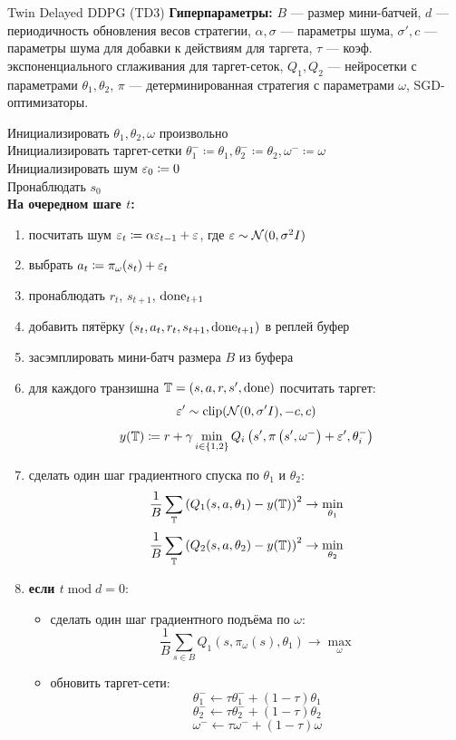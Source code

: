 \begin{algorithm}[label = TD3]{Twin Delayed DDPG (TD3)}
\textbf{Гиперпараметры:} $B$ --- размер мини-батчей, $d$ --- периодичность обновления весов стратегии, $\alpha, \sigma$ --- параметры шума, $\sigma', c$ --- параметры шума для добавки к действиям для таргета, $\tau$ --- коэф. экспоненциального сглаживания для таргет-сеток, $Q_1, Q_2$ --- нейросетки с параметрами $\theta_1, \theta_2$, $\pi$ --- детерминированная стратегия с параметрами $\omega$, SGD-оптимизаторы.

\vspace{0.3cm}
Инициализировать $\theta_1, \theta_2, \omega$ произвольно \\
Инициализировать таргет-сетки $\theta_1^- \coloneqq \theta_1, \theta_2^- \coloneqq \theta_2, \omega^- \coloneqq \omega$ \\
Инициализировать шум $\varepsilon_0 \coloneqq 0$ \\
Пронаблюдать $s_0$ \\
\textbf{На очередном шаге $t$:}
\begin{enumerate}
    \item посчитать шум $\varepsilon_{t} \coloneqq \alpha \varepsilon_{t-1} + \varepsilon$, где $\varepsilon \sim \mathcal{N}(0, \sigma^2 I)$
    \item выбрать $a_t \coloneqq \pi_\omega(s_t) + \varepsilon_{t}$
    \item пронаблюдать $r_t$,  $s_{t+1}$, $\mathrm{done}_{t+1}$
    \item добавить пятёрку $(s_t, a_t, r_t, s_{t+1}, \mathrm{done}_{t+1})$ в реплей буфер
    \item засэмплировать мини-батч размера $B$ из буфера
    \item для каждого транзишна $\mathbb{T} = (s, a, r, s', \mathrm{done})$ посчитать таргет:
    $$\varepsilon' \sim \mathrm{clip}(\mathcal{N}(0, \sigma'I), -c, c)$$
    $$y(\mathbb{T} ) \coloneqq r + \gamma \min_{i \in \{1, 2\}}Q_i\left( s', \pi \left( s', \omega^{-}\right) + \varepsilon', \theta_i^{-} \right)$$
    \item сделать один шаг градиентного спуска по $\theta_1$ и $\theta_2$:
    $$\frac{1}{B}\sum_{\mathbb{T}} \left( Q_1(s, a, \theta_1) - y(\mathbb{T} ) \right) ^2 \to \min_{\theta_1}$$
    $$\frac{1}{B}\sum_{\mathbb{T}} \left( Q_2(s, a, \theta_2) - y(\mathbb{T} ) \right) ^2 \to \min_{\theta_2}$$
    \item \textbf{если $t \operatorname{mod} d = 0$}:
    \begin{itemize}
        \item сделать один шаг градиентного подъёма по $\omega$:
        $$\frac{1}{B}\sum_{s \in B} Q_1(s, \pi_\omega(s), \theta_1) \to \max_{\omega}$$
        \item обновить таргет-сети:
        $$\theta^{-}_1 \gets \tau \theta^{-}_1 + (1 - \tau) \theta_1$$
        $$\theta^{-}_2 \gets \tau \theta^{-}_2 + (1 - \tau) \theta_2$$
        $$\omega^{-} \gets \tau \omega^{-}   + (1 - \tau) \omega$$
    \end{itemize}
\end{enumerate}
\end{algorithm}

